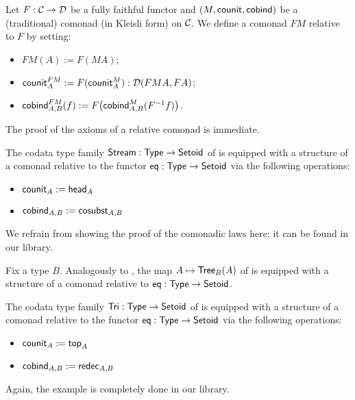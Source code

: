 \documentclass{amsart}
\begin{document}
\begin{example}\label{ex_relcom_from_com}
  Let $F : {\mathcal{C}} \to \mathcal{D}$ be a fully faithful functor and $(M,\mathsf{counit},\mathsf{cobind})$ be a (traditional) comonad (in Kleisli form) on ${\mathcal{C}}$.
  We define a comonad $FM$ relative to $F$ by setting:
  \begin{itemize}
   \item $FM(A) := F(MA)$;
   \item $\mathsf{counit}^{FM}_A := F(\mathsf{counit}^M_A) : \mathcal{D}(FMA,FA)$;
   \item $\mathsf{cobind}^{FM}_{A,B} (f) := F\bigl(\mathsf{cobind}^M_{A,B}(F^{-1}f)\bigr)$.
  \end{itemize}
  The proof of the axioms of a relative comonad is immediate.
\end{example}



\begin{example}[Streams]\label{ex_stream_comonad}
  The codata type family $\mathsf{Stream} : \mathsf{Type} \to \mathsf{Setoid}$ of  is equipped with a structure of a comonad relative to the functor 
  $\mathsf{eq} : \mathsf{Type} \to \mathsf{Setoid}$ via the following operations:
  \begin{itemize}
   \item $\mathsf{counit}_A := \mathsf{head}_A$
   \item $\mathsf{cobind}_{A,B} := \mathsf{cosubst}_{A,B}$ 
  \end{itemize}
  We refrain from showing the proof of the comonadic laws here; it can be found in our \coq library.  
\end{example}

\begin{example}[Trees]\label{ex_tree_comonad}
 Fix a type $B$. Analogously to , the map $A \mapsto \mathsf{Tree}_B(A)$ of 
 is equipped with a structure of a comonad relative to $\mathsf{eq}: \mathsf{Type}\to\mathsf{Setoid}$.
\end{example}


\begin{example}\label{ex:tri_comonad}
 
  The codata type family $\mathsf{Tri} : \mathsf{Type} \to \mathsf{Setoid}$ of  is equipped with a structure of a comonad relative to the functor 
  $\mathsf{eq} : \mathsf{Type} \to \mathsf{Setoid}$ via the following operations:
  \begin{itemize}
   \item $\mathsf{counit}_A := \mathsf{top}_A$
   \item $\mathsf{cobind}_{A,B} := \mathsf{redec}_{A,B}$ 
  \end{itemize}
 Again, the example is completely done in our \coq library.
\end{example}
\end{document}

